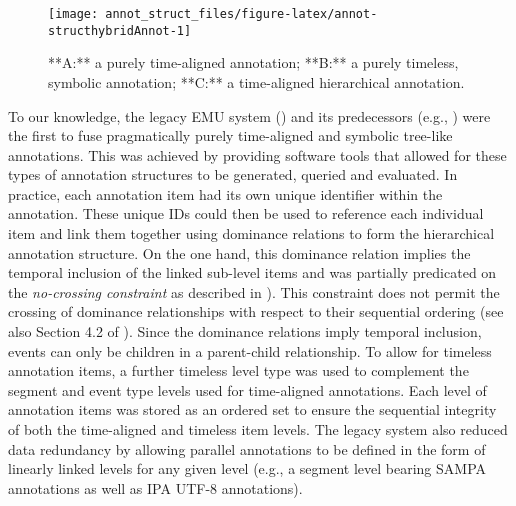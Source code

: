 \documentclass[
]{book}
\begin{document}
\begin{figure}

{\centering \texttt{[image: annot\_struct\_files/figure-latex/annot-structhybridAnnot-1]} 

}

\caption{**A:** a purely time-aligned annotation; **B:** a purely timeless, symbolic annotation; **C:** a time-aligned hierarchical annotation.}\label{fig:annot-structhybridAnnot}
\end{figure}

To our knowledge, the legacy EMU system (\citet{cassidy:sc2001a}) and its predecessors (e.g., \citet{harrington:csl1993a}) were the first to fuse pragmatically purely time-aligned and symbolic tree-like annotations. This was achieved by providing software tools that allowed for these types of annotation structures to be generated, queried and evaluated. In practice, each annotation item had its own unique identifier within the annotation. These unique IDs could then be used to reference each individual item and link them together using dominance relations to form the hierarchical annotation structure. On the one hand, this dominance relation implies the temporal inclusion of the linked sub-level items and was partially predicated on the \emph{no-crossing constraint} as described in \citet{coleman:lp1991a}). This constraint does not permit the crossing of dominance relationships with respect to their sequential ordering (see also Section 4.2 of \citet{cassidy:sc2001a}). Since the dominance relations imply temporal inclusion, events can only be children in a parent-child relationship. To allow for timeless annotation items, a further timeless level type was used to complement the segment and event type levels used for time-aligned annotations. Each level of annotation items was stored as an ordered set to ensure the sequential integrity of both the time-aligned and timeless item levels. The legacy system also reduced data redundancy by allowing parallel annotations to be defined in the form of linearly linked levels for any given level (e.g., a segment level bearing SAMPA annotations as well as IPA UTF-8 annotations).
\end{document}
